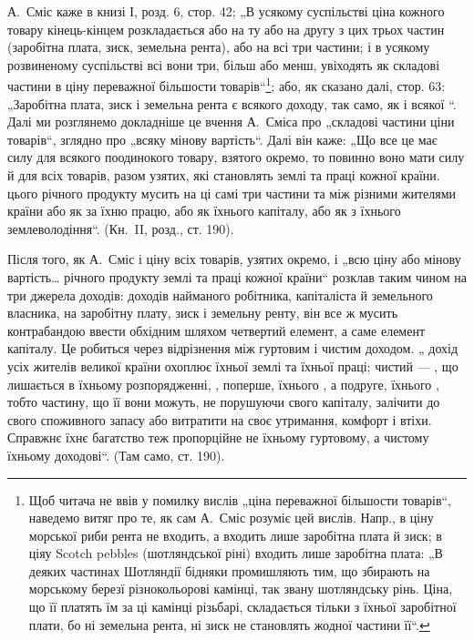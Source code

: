 А.~Сміс каже в книзі І, розд. 6, стор. 42; „В усякому суспільстві
ціна кожного товару кінець-кінцем розкладається або на ту або на другу
з цих трьох частин (заробітна плата, зиск, земельна рента), або на всі
три частини; і в усякому розвиненому суспільстві всі вони три, більш
або менш, увіходять як складові частини в ціну переважної більшости
товарів“\footnote{
Щоб читача не ввів у помилку вислів „ціна переважної більшости товарів“,
наведемо витяг про те, як сам А.~Сміс розуміє цей вислів. Напр., в ціну морської
риби рента не входить, а входить лише заробітна плата й зиск; в ціяу Scotch
pebbles (шотляндської ріні) входить лише заробітна плата: „В деяких частинах
Шотляндії бідняки промишляють тим, що збирають на морському березї різнокольорові
камінці, так звану шотляндську рінь. Ціна, що її платять їм за ці камінці
різьбарі, складається тільки з їхньої заробітної плати, бо ні земельна рента, ні
зиск не становлять жодної частини її“.
}; або, як сказано далі, стор. 63: „Заробітна плата, зиск і земельна
рента є  всякого доходу, так само,
як і всякої “. Далі ми розглянемо докладніше це
вчення А.~Сміса про „складові частини ціни товарів“, зглядно про „всяку
мінову вартість“. Далі він каже: „Що все це має силу для всякого
поодинокого товару, взятого окремо, то повинно воно мати силу й для
всіх товарів, разом узятих, які становлять 
землі та праці кожної країни. 
цього річного продукту мусить  на ці самі три частини
та  між різними жителями країни або як  за
їхню працю, або як  їхнього капіталу, або як  з їхнього
землеволодіння“. (Кн.~II, розд., ст. 190).

Після того, як А.~Сміс і ціну всіх товарів, узятих окремо, і „всю ціну
або мінову вартість\dots{} річного продукту землі та праці кожної країни“
розклав таким чином на три джерела доходів: доходів найманого робітника,
капіталіста й земельного власника, на заробітну плату, зиск і земельну
ренту, він все ж мусить контрабандою ввести обхідним шляхом
четвертий елемент, а саме елемент капіталу. Це робиться через відрізнення
між гуртовим і чистим доходом. „ дохід усіх жителів великої
країни охоплює  їхньої землі та їхньої праці;
чистий  — , що лишається в їхньому розпорядженні,
, поперше, їхнього ,
а подруге, їхнього , тобто
частину, що її вони можуть, не порушуючи свого капіталу, залічити
до свого споживного запасу або витратити на своє утримання, комфорт
і втіхи. Справжнє їхнє багатство теж пропорційне не їхньому гуртовому,
а чистому їхньому доходові“. (Там само, ст. 190).

